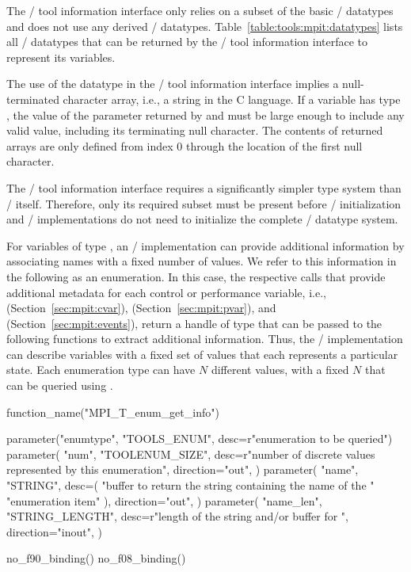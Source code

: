 The \MPI/ tool information interface only relies on a subset of the basic
\MPI/ datatypes and does not use any derived \MPI/ datatypes.
Table~\ref{table:tools:mpit:datatypes} lists all \MPI/ datatypes that can
be returned by the \MPI/ tool information interface to represent its
variables.

The use of the datatype  in the \MPI/ tool information
interface implies a null-terminated character array, i.e., a string in the
C language.  If a variable has type , the value of the
 parameter returned by 
and  must  be large enough to include
any valid value, including its terminating null character.  The contents of
returned  arrays are only defined from index 0 through the
location of the first null character.

\begin{rationale}
The \MPI/ tool information interface requires a significantly simpler type
system than \MPI/ itself.  Therefore, only its required subset must be
present before \MPI/ initialization and \MPI/ implementations do not need
to initialize the complete \MPI/ datatype system.
\end{rationale}

For variables of type , an \MPI/ implementation can provide
additional information by associating names with a fixed number of values.
We refer to this information in the following as an enumeration.  In this
case, the respective calls that provide additional metadata for each
control or performance variable, i.e., 
(Section~\ref{sec:mpit:cvar}), 
(Section~\ref{sec:mpit:pvar}), and 
(Section~\ref{sec:mpit:events}), return a handle of type
 that can be passed to the
following functions to extract additional information.  Thus, the \MPI/
implementation can describe variables with a fixed set of values that each
represents a particular state.  Each enumeration type can have $N$
different values, with a fixed $N$ that can be queried using
.

\begin{mpi-binding}
    function_name("MPI_T_enum_get_info")
    
    parameter("enumtype", "TOOLS_ENUM", desc=r"enumeration to be queried")
    parameter(
        "num",
        "TOOLENUM_SIZE",
        desc=r"number of discrete values represented by this enumeration",
        direction="out",
    )
    parameter(
        "name",
        "STRING",
        desc=(
            "buffer to return the string containing the name of the "
            "enumeration item"
        ),
        direction="out",
    )
    parameter(
        "name_len",
        "STRING_LENGTH",
        desc=r"length of the string and/or buffer for ",
        direction="inout",
    )
    
    no_f90_binding()
    no_f08_binding()
\end{mpi-binding}

